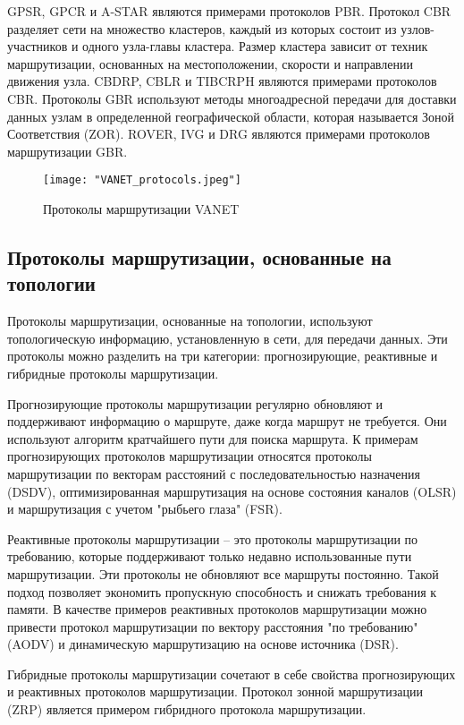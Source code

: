 GPSR, GPCR и A-STAR являются примерами протоколов PBR. Протокол CBR разделяет сети на множество кластеров, каждый из которых состоит из узлов-участников и одного узла-главы кластера. Размер кластера зависит от техник маршрутизации, основанных на местоположении, скорости и направлении движения узла. CBDRP, CBLR и TIBCRPH являются примерами протоколов CBR. Протоколы GBR используют методы многоадресной передачи для доставки данных узлам в определенной географической области, которая называется Зоной Соответствия (ZOR). ROVER, IVG и DRG являются примерами протоколов маршрутизации GBR.

\begin{figure}[!h]
    \centering
    \texttt{[image: "VANET\_protocols.jpeg"]}
    \caption{Протоколы маршрутизации VANET}
    \label{fig:vanet_protocols}
\end{figure}

\subsection*{Протоколы маршрутизации, основанные на топологии}

Протоколы маршрутизации, основанные на топологии, используют топологическую информацию, установленную в сети, для передачи данных. Эти протоколы можно разделить на три категории: прогнозирующие, реактивные и гибридные протоколы маршрутизации.

Прогнозирующие протоколы маршрутизации регулярно обновляют и поддерживают информацию о маршруте, даже когда маршрут не требуется. Они используют алгоритм кратчайшего пути для поиска маршрута. К примерам прогнозирующих протоколов маршрутизации относятся протоколы маршрутизации по векторам расстояний с последовательностью назначения (DSDV), оптимизированная маршрутизация на основе состояния каналов (OLSR) и маршрутизация с учетом "рыбьего глаза" (FSR).

Реактивные протоколы маршрутизации – это протоколы маршрутизации по требованию, которые поддерживают только недавно использованные пути маршрутизации. Эти протоколы не обновляют все маршруты постоянно. Такой подход позволяет экономить пропускную способность и снижать требования к памяти. В качестве примеров реактивных протоколов маршрутизации можно привести протокол маршрутизации по вектору расстояния "по требованию" (AODV) и динамическую маршрутизацию на основе источника (DSR).

Гибридные протоколы маршрутизации сочетают в себе свойства прогнозирующих и реактивных протоколов маршрутизации. Протокол зонной маршрутизации (ZRP) является примером гибридного протокола маршрутизации.

